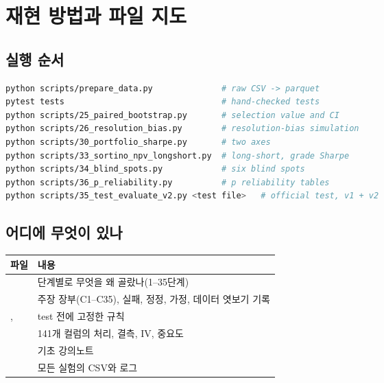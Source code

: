 \chapter{재현 방법과 파일 지도}
\section{실행 순서}
\begin{lstlisting}[language=bash]
python scripts/prepare_data.py              # raw CSV -> parquet
pytest tests                                # hand-checked tests
python scripts/25_paired_bootstrap.py       # selection value and CI
python scripts/26_resolution_bias.py        # resolution-bias simulation
python scripts/30_portfolio_sharpe.py       # two axes
python scripts/33_sortino_npv_longshort.py  # long-short, grade Sharpe
python scripts/34_blind_spots.py            # six blind spots
python scripts/36_p_reliability.py          # p reliability tables
python scripts/35_test_evaluate_v2.py <test file>   # official test, v1 + v2
\end{lstlisting}

\section{어디에 무엇이 있나}
\begin{table}[H]\centering\small
\begin{tabularx}{\linewidth}{@{}p{55mm}L@{}}\toprule
파일 & 내용\\\midrule
{} & 단계별로 무엇을 왜 골랐나(1--35단계)\\
 & 주장 장부(C1--C35), 실패, 정정, 가정, 데이터 엿보기 기록\\
,  & test 전에 고정한 규칙\\
 & 141개 컬럼의 처리, 결측, IV, 중요도\\
 & 기초 강의노트\\
 & 모든 실험의 CSV와 로그\\\bottomrule
\end{tabularx}
\end{table}


